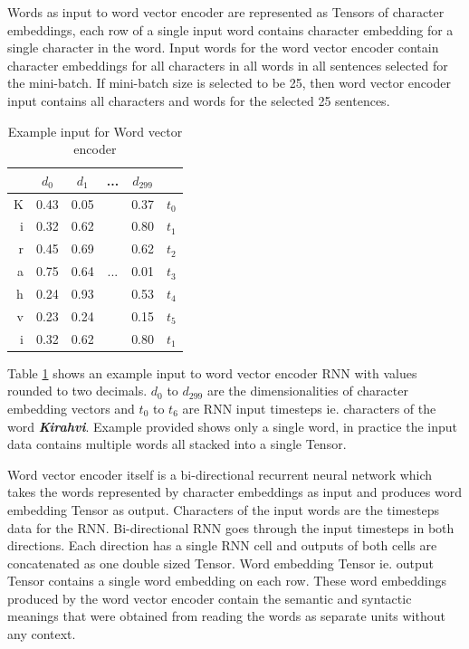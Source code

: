 \documentclass[12pt,a4paper,english
]{tutthesis}
\begin{document}
Words as input to word vector encoder are represented as Tensors of character embeddings, each row of a single input word contains character embedding for a single character in the word. Input words for the word vector encoder contain character embeddings for all characters in all words in all sentences selected for the mini-batch. If mini-batch size is selected to be 25, then word vector encoder input contains all characters and words for the selected 25 sentences.

\begin{table}[htbp]
\caption{Example input for Word vector encoder}
\label{table:word_vector_encoder_input}
\centering
\begin{tabular}{|r|c|c|c|c|l|}
  \hline
  & $d_0$ & $d_1$ & ... & $d_{299}$ & \\
  \hline
  \hline
  K & 0.43 & 0.05 & & 0.37 & $t_0$ \\
  i & 0.32 & 0.62 & & 0.80 & $t_1$ \\
  r & 0.45 & 0.69 & & 0.62 & $t_2$ \\
  a & 0.75 & 0.64 & ... & 0.01 & $t_3$ \\
  h & 0.24 & 0.93 & & 0.53 & $t_4$ \\
  v & 0.23 & 0.24 & & 0.15 & $t_5$ \\
  i & 0.32 & 0.62 & & 0.80 & $t_1$ \\
  \hline
\end{tabular}
\end{table}
Table \ref{table:word_vector_encoder_input} shows an example input to word vector encoder RNN with values rounded to two decimals. $d_0$ to $d_{299}$ are the dimensionalities of character embedding vectors and $t_0$ to $t_6$ are RNN input timesteps ie. characters of the word \textbf{\textit{Kirahvi}}. Example provided shows only a single word, in practice the input data contains multiple words all stacked into a single Tensor.

Word vector encoder itself is a bi-directional recurrent neural network which takes the words represented by character embeddings as input and produces word embedding Tensor as output. Characters of the input words are the timesteps data for the RNN. Bi-directional RNN goes through the input timesteps in both directions. Each direction has a single RNN cell and outputs of both cells are concatenated as one double sized Tensor. Word embedding Tensor ie. output Tensor contains a single word embedding on each row. These word embeddings produced by the word vector encoder contain the semantic and syntactic meanings that were obtained from reading the words as separate units without any context.
\end{document}
